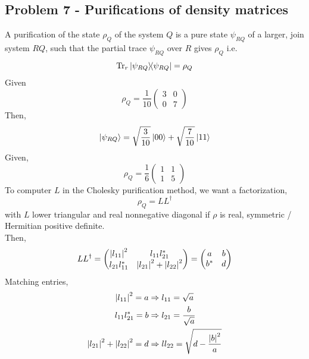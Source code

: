 \subsection{Problem 7 - Purifications of density matrices}
A purification of the state $\rho_Q$ of the system $Q$ is a pure state $\psi_{RQ}$ of a larger, join system $RQ$, such that the partial trace $\psi_{RQ}$ over $R$ gives $\rho_Q$ i.e. 
\begin{equation}
    \Tr_r\ketbra{\psi_{RQ}}{\psi_{RQ}} = \rho_Q
\end{equation}
Given
\begin{equation}
    \rho_Q = \frac{1}{10}\begin{pmatrix}3 & 0 \\ 0 & 7 \end{pmatrix}
\end{equation}
Then, 
\begin{align}
    \ket{\psi_{RQ}} = \sqrt{\frac{3}{10}}\ket{00} + \sqrt{\frac{7}{10}}\ket{11} 
\end{align}
Given, 
\begin{equation}
    \rho_Q = \frac{1}{6}\begin{pmatrix}1 & 1 \\ 1 & 5 \end{pmatrix} \label{rho_q}
\end{equation}
To computer $L$ in the Cholesky purification method, we want a factorization,
\begin{equation}
    \rho_Q = L L^\dagger
\end{equation}
with $L$ lower triangular and real nonnegative diagonal if $\rho$ is real, symmetric / Hermitian positive definite. \\
Then,
\begin{equation}
    LL^\dagger = \begin{pmatrix}\abs{l_{11}}^2 & l_{11}l^*_{21} \\ l_{21}l^*_{11} & \abs{l_{21}}^2 + \abs{l_{22}}^2\end{pmatrix} = \begin{pmatrix}a & b \\ b^* & d \end{pmatrix}
\end{equation}
Matching entries,
\begin{align}
    \abs{l_{11}}^2 = a & \Rightarrow l_{11} = \sqrt{a} \\
    l_{11}l^*_{21} = b & \Rightarrow l_{21} = \frac{b}{\sqrt{a}} \\
    \abs{l_{21}}^2 + \abs{l_{22}}^2 = d & \Rightarrow ll_{22} = \sqrt{d - \frac{\abs{b}^2}{a}}
\end{align}
